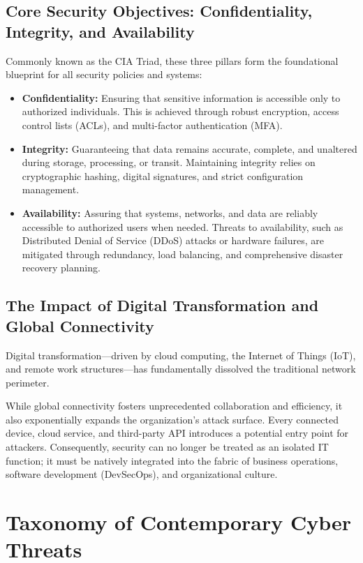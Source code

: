 \documentclass[11pt,a4paper]{article}
\begin{document}
\subsection{Core Security Objectives: Confidentiality, Integrity, and Availability}
Commonly known as the CIA Triad, these three pillars form the foundational blueprint for all security policies and systems:

\begin{itemize}
    \item \textbf{Confidentiality:} Ensuring that sensitive information is accessible only to authorized individuals. This is achieved through robust encryption, access control lists (ACLs), and multi-factor authentication (MFA).

    \item \textbf{Integrity:} Guaranteeing that data remains accurate, complete, and unaltered during storage, processing, or transit. Maintaining integrity relies on cryptographic hashing, digital signatures, and strict configuration management.

    \item \textbf{Availability:} Assuring that systems, networks, and data are reliably accessible to authorized users when needed. Threats to availability, such as Distributed Denial of Service (DDoS) attacks or hardware failures, are mitigated through redundancy, load balancing, and comprehensive disaster recovery planning.
\end{itemize}

\subsection{The Impact of Digital Transformation and Global Connectivity}
Digital transformation—driven by cloud computing, the Internet of Things (IoT), and remote work structures—has fundamentally dissolved the traditional network perimeter.
\vspace{1em}

While global connectivity fosters unprecedented collaboration and efficiency, it also exponentially expands the organization's attack surface. Every connected device, cloud service, and third-party API introduces a potential entry point for attackers. Consequently, security can no longer be treated as an isolated IT function; it must be natively integrated into the fabric of business operations, software development (DevSecOps), and organizational culture.

\section{Taxonomy of Contemporary Cyber Threats}
\end{document}
